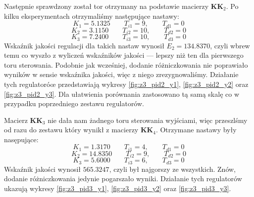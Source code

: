Następnie sprawdzony został tor otrzymany na podstawie macierzy $\bm{KK}_2$.
Po kilku eksperymentach otrzymaliśmy następujące nastawy:
\begin{equation}
  K_1 = \num{5.1325} \qquad T_{i1} = 9, \qquad T_{d1} = 0 \nonumber
\end{equation}
\begin{equation}
  K_2 = \num{3.1150} \qquad T_{i2} = 10, \qquad T_{d2} = 0
\end{equation}
\begin{equation}
  K_3 = \num{7.2400} \qquad T_{i3} = 10, \qquad T_{d3} = 0 \nonumber
\end{equation}
Wskaźnik jakości regulacji dla takich nastaw wynosił $E_2 = \num{134.8370}$, czyli
wbrew temu co wyszło z wyliczeń wskaźników jakości --- lepszy niż ten dla pierwszego
toru sterowania. Podobnie jak wcześniej, dodanie różniczkowania nie poprawiało
wyników w sensie wskaźnika jakości, więc z niego zrezygnowaliśmy. Działanie
tych regulatoróœ przedstawiają wykresy \ref{fig:z3_pid2_y1},
\ref{fig:z3_pid2_y2} oraz \ref{fig:z3_pid2_y3}. Dla ułatwienia porównania zastosowano
tą samą skalę co w przypadku poprzedniego zestawu regulatorów.


Macierz $\bm{KK}_3$ nie dała nam żadnego toru sterowania wyjściami, więc przeszlśmy
od razu do zestawu który wynikł z macierzy $\bm{KK}_4$. Otrzymane nastawy
były nasępujące:
\begin{equation}
  K_1 = \num{1.3170} \qquad T_{i1} = 4, \qquad T_{d1} = 0 \nonumber
\end{equation}
\begin{equation}
  K_2 = \num{14.8350} \qquad T_{i2} = 9, \qquad T_{d2} = 0
\end{equation}
\begin{equation}
  K_3 = \num{5.6000} \qquad T_{i3} = 6, \qquad T_{d3} = 0 \nonumber
\end{equation}
Wskaźnik jakości wynosił $\num{565.3247}$, czyli był najgorszy ze wszystkich.
Znów, dodanie różniczkowania jedynie pogarszało wyniki. Działanie tych
regulatorów ukazują wykresy \ref{fig:z3_pid3_y1},
\ref{fig:z3_pid3_y2} oraz \ref{fig:z3_pid3_y3}.

